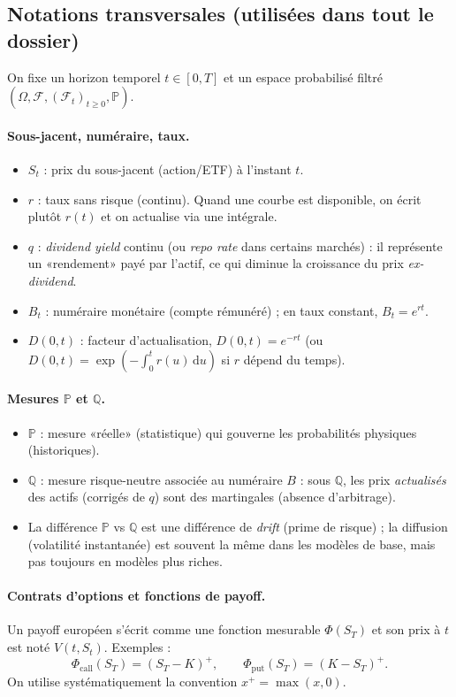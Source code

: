 \documentclass[11pt,a4paper]{report}
\theoremstyle{definition}
\theoremstyle{plain}
\theoremstyle{remark}
\newcommand{\dd}{\mathrm{d}}
\newcommand{\1}{\mathbf{1}}
\newcommand{\Pmeas}{\mathbb{P}}
\newcommand{\Qmeas}{\mathbb{Q}}
\newcommand{\F}{\mathcal{F}}
\begin{document}
\subsection*{Notations transversales (utilisées dans tout le dossier)}
On fixe un horizon temporel $t\in[0,T]$ et un espace probabilisé filtré $(\Omega,\F,(\F_t)_{t\ge 0},\Pmeas)$.

\paragraph{Sous-jacent, numéraire, taux.}
\begin{itemize}[leftmargin=*]
\item $S_t$ : prix du sous-jacent (action/ETF) à l'instant $t$.
\item $r$ : taux sans risque (continu). Quand une courbe est disponible, on écrit plutôt $r(t)$ et on actualise via une intégrale.
\item $q$ : \emph{dividend yield} continu (ou \emph{repo rate} dans certains marchés) : il représente un «rendement» payé par l'actif, ce qui diminue la croissance du prix \emph{ex-dividend}.
\item $B_t$ : numéraire monétaire (compte rémunéré) ; en taux constant, $B_t=e^{rt}$.
\item $D(0,t)$ : facteur d'actualisation, $D(0,t)=e^{-rt}$ (ou $D(0,t)=\exp(-\int_0^t r(u)\,\dd u)$ si $r$ dépend du temps).
\end{itemize}

\paragraph{Mesures $\Pmeas$ et $\Qmeas$.}
\begin{itemize}[leftmargin=*]
\item $\Pmeas$ : mesure «réelle» (statistique) qui gouverne les probabilités physiques (historiques).
\item $\Qmeas$ : mesure risque-neutre associée au numéraire $B$ : sous $\Qmeas$, les prix \emph{actualisés} des actifs (corrigés de $q$) sont des martingales (absence d'arbitrage).
\item La différence $\Pmeas$ vs $\Qmeas$ est une différence de \emph{drift} (prime de risque) ; la diffusion (volatilité instantanée) est souvent la même dans les modèles de base, mais pas toujours en modèles plus riches.
\end{itemize}

\paragraph{Contrats d'options et fonctions de payoff.}
Un payoff européen s'écrit comme une fonction mesurable $\Phi(S_T)$ et son prix à $t$ est noté $V(t,S_t)$.
Exemples :
\[
\Phi_{\text{call}}(S_T)=(S_T-K)^+,\qquad \Phi_{\text{put}}(S_T)=(K-S_T)^+.
\]
On utilise systématiquement la convention $x^+=\max(x,0)$.
\end{document}

